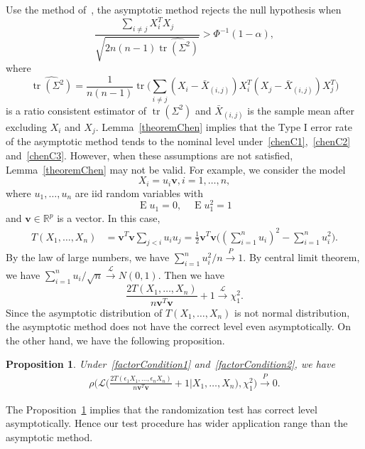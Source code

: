 \documentclass[review]{elsarticle}
\DeclareMathOperator{\mytr}{tr}
\DeclareMathOperator{\myE}{E}
\newcommand{\Bv}{\mathbf{v}}
\theoremstyle{plain}
\newtheorem{proposition}{\quad\quad Proposition}
\theoremstyle{definition}
\theoremstyle{remark}
\begin{document}
Use the method of~\citet{Chen2010A}, the asymptotic method rejects the null hypothesis when
\begin{equation*}
\frac{\sum_{i\neq j}X_i^T X_j}{\sqrt{2n(n-1)\widehat{\mytr(\Sigma^2)}}}>\Phi^{-1}(1-\alpha),
\end{equation*}
where
 \begin{equation*}
 \widehat{\mytr(\Sigma^2)}=\frac{1}{n(n-1)}\mytr\Big(\sum_{i\neq j}(X_i-\bar{X}_{(i,j)})X_i^T (X_j-\bar{X}_{(i,j)})X_j^T\Big)
 \end{equation*}
is a ratio consistent estimator of $\mytr(\Sigma^2)$ and $\bar{X}_{(i,j)}$ is the sample mean after excluding $X_i$ and $X_j$.
Lemma~\ref{theoremChen} implies that the Type I error rate of the asymptotic method  tends to the nominal level under~\eqref{chenC1},~\eqref{chenC2} and~\eqref{chenC3}.
However, when these assumptions are not satisfied, Lemma~\ref{theoremChen} may not be valid.
For example, we consider the model 
\begin{equation}\label{factorCondition1}
X_i=u_i\Bv, i=1,\ldots,n,
\end{equation}
where
 $u_1,\ldots,u_n$ are iid random variables with 
 \begin{equation}\label{factorCondition2}
 \myE u_1=0, \quad\myE u_1^2=1
 \end{equation}
 and $\Bv\in\mathbb{R}^p$ is a vector.
In this case, 
\begin{equation*}
    \begin{aligned}
        T(X_1,\ldots,X_n)&=\Bv^T \Bv\sum_{j<i} u_i u_j
        =\frac{1}{2}\Bv^T \Bv\big( (\sum_{i=1}^n u_i)^2-\sum_{i=1}^n u_i^2\big).
    \end{aligned}
\end{equation*}
By the law of large numbers, we have $\sum_{i=1}^n u_i^2/n\xrightarrow{P} 1$. By central limit theorem, we have $\sum_{i=1}^n u_i/\sqrt{n}\xrightarrow{\mathcal{L}}N(0,1)$. Then we have
\begin{equation*}
\frac{2T(X_1,\ldots,X_n)}{n\Bv^T \Bv }+1\xrightarrow{\mathcal{L}}\chi^2_1.
\end{equation*}
Since  the asymptotic distribution of $T(X_1,\ldots, X_n)$ is not normal distribution, the asymptotic method does not have the correct level even asymptotically.
On the other hand, we have the following proposition.
\begin{proposition}\label{prop:factor}
    Under~\eqref{factorCondition1} and~\eqref{factorCondition2}, we have
\begin{equation*}
    \begin{aligned}
        \rho\bigg(\mathcal{L}\Big(\frac{2T(\epsilon_1 X_1,\ldots,\epsilon_n X_n)}{n\Bv^T \Bv}+1\Big|X_1,\ldots,X_n\Big),\chi^2_1\bigg)\xrightarrow{P}0.
    \end{aligned}
\end{equation*}
\end{proposition}
The Proposition~\ref{prop:factor} implies that the randomization test has correct level asymptotically.
Hence our test procedure has wider application range than the asymptotic method.
\end{document}
